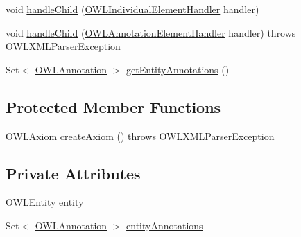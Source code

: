 \begin{DoxyCompactItemize}
\item 
void \hyperlink{classorg_1_1coode_1_1owlapi_1_1owlxmlparser_1_1_o_w_l_declaration_axiom_element_handler_a42a5147cfa11671799827c3f63f8e749}{handle\-Child} (\hyperlink{classorg_1_1coode_1_1owlapi_1_1owlxmlparser_1_1_o_w_l_individual_element_handler}{O\-W\-L\-Individual\-Element\-Handler} handler)
\item 
void \hyperlink{classorg_1_1coode_1_1owlapi_1_1owlxmlparser_1_1_o_w_l_declaration_axiom_element_handler_a7410cfa22247040f1b1c264ad43cd86f}{handle\-Child} (\hyperlink{classorg_1_1coode_1_1owlapi_1_1owlxmlparser_1_1_o_w_l_annotation_element_handler}{O\-W\-L\-Annotation\-Element\-Handler} handler)  throws O\-W\-L\-X\-M\-L\-Parser\-Exception 
\item 
Set$<$ \hyperlink{interfaceorg_1_1semanticweb_1_1owlapi_1_1model_1_1_o_w_l_annotation}{O\-W\-L\-Annotation} $>$ \hyperlink{classorg_1_1coode_1_1owlapi_1_1owlxmlparser_1_1_o_w_l_declaration_axiom_element_handler_ab2986e2182490e8d585ef0bf3be19f4e}{get\-Entity\-Annotations} ()
\end{DoxyCompactItemize}
\subsection*{Protected Member Functions}
\begin{DoxyCompactItemize}
\item 
\hyperlink{interfaceorg_1_1semanticweb_1_1owlapi_1_1model_1_1_o_w_l_axiom}{O\-W\-L\-Axiom} \hyperlink{classorg_1_1coode_1_1owlapi_1_1owlxmlparser_1_1_o_w_l_declaration_axiom_element_handler_a7a49578b56070c36f7cb1cfb245e0bb3}{create\-Axiom} ()  throws O\-W\-L\-X\-M\-L\-Parser\-Exception 
\end{DoxyCompactItemize}
\subsection*{Private Attributes}
\begin{DoxyCompactItemize}
\item 
\hyperlink{interfaceorg_1_1semanticweb_1_1owlapi_1_1model_1_1_o_w_l_entity}{O\-W\-L\-Entity} \hyperlink{classorg_1_1coode_1_1owlapi_1_1owlxmlparser_1_1_o_w_l_declaration_axiom_element_handler_a6001d51abd2564681e1f57e1f397b780}{entity}
\item 
Set$<$ \hyperlink{interfaceorg_1_1semanticweb_1_1owlapi_1_1model_1_1_o_w_l_annotation}{O\-W\-L\-Annotation} $>$ \hyperlink{classorg_1_1coode_1_1owlapi_1_1owlxmlparser_1_1_o_w_l_declaration_axiom_element_handler_afa891979bb37b2e2b2218ea75e76fbf8}{entity\-Annotations}
\end{DoxyCompactItemize}


